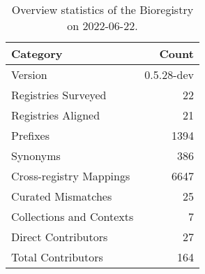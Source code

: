 \begin{table}
\centering
\caption{Overview statistics of the Bioregistry on 2022-06-22.}
\label{tab:bioregistry-summary}
\begin{tabular}{lr}
\toprule
                Category &      Count \\
\midrule
                 Version & 0.5.28-dev \\
     Registries Surveyed &         22 \\
      Registries Aligned &         21 \\
                Prefixes &       1394 \\
                Synonyms &        386 \\
 Cross-registry Mappings &       6647 \\
      Curated Mismatches &         25 \\
Collections and Contexts &          7 \\
     Direct Contributors &         27 \\
      Total Contributors &        164 \\
\bottomrule
\end{tabular}
\end{table}
